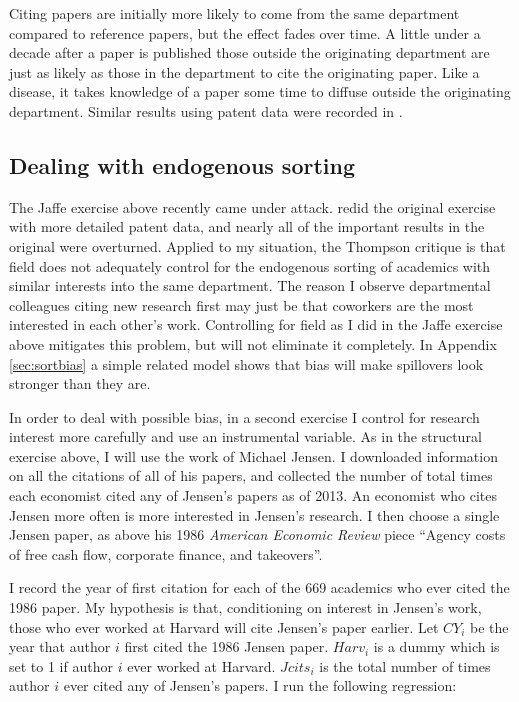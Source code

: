 \documentclass[]{article}
\begin{document}
Citing papers are initially more likely to come from the same department
compared to reference papers, but the effect fades over time. A little
under a decade after a paper is published those outside the originating
department are just as likely as those in the department to cite the
originating paper. Like a disease, it takes knowledge of a paper some
time to diffuse outside the originating department. Similar results
using patent data were recorded in \citet{jaffe1993geographic}.

\subsection{Dealing with endogenous sorting}

The Jaffe exercise above recently came under attack.
\citet{thompson2005patent} redid the original exercise with more
detailed patent data, and nearly all of the important results in the
original were overturned. Applied to my situation, the Thompson critique
is that field does not adequately control for the endogenous sorting of
academics with similar interests into the same department. The reason I
observe departmental colleagues citing new research first may just be
that coworkers are the most interested in each other's work. Controlling
for field as I did in the Jaffe exercise above mitigates this problem,
but will not eliminate it completely. In Appendix \ref{sec:sortbias} a simple
related model shows that bias will make spillovers look stronger than they are.

In order to deal with possible bias, in a second exercise I control for
research interest more carefully and use an instrumental variable.
As in the structural exercise above, I will use the work of Michael Jensen.
I downloaded information on all the
citations of all of his papers, and collected the number of total times
each economist cited any of Jensen's papers as of 2013. An economist who
cites Jensen more often is more interested in Jensen's research. I then
choose a single Jensen paper, as above his 1986 \emph{American Economic Review} piece
``Agency costs of free cash flow, corporate finance, and takeovers''.

I record the year of first citation for each of the 669 academics who
ever cited the 1986 paper. My hypothesis is that, conditioning on interest in
Jensen's work, those who ever worked at Harvard will cite Jensen's paper
earlier. Let $CY_i$ be the year that author $i$ first cited the 1986 Jensen paper.
$Harv_i$ is a dummy which is set to 1 if author $i$ ever worked at Harvard. 
$Jcits_i$ is the total number of times author $i$ ever cited any of Jensen's 
papers.  I run the following regression:
\end{document}
